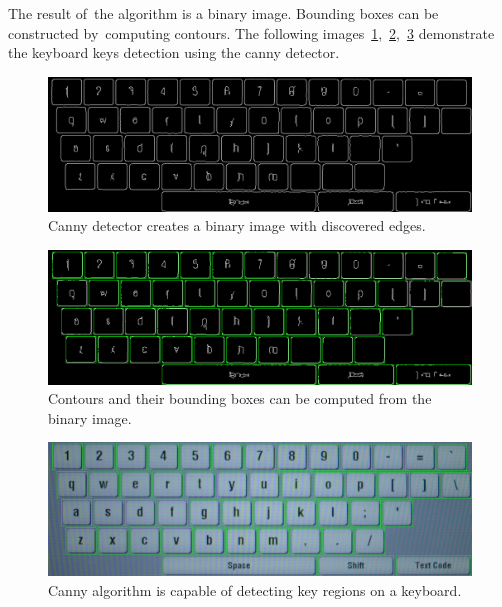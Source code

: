 The result of~the algorithm is a binary image. Bounding boxes can be constructed by~computing contours. The following images~\ref{algorithms-canny-binary},~\ref{algorithms-canny-binary-bboxes},~\ref{algorithms-canny-result-bboxes} demonstrate the keyboard keys detection using the canny detector.
\begin{figure}[hbt]
    \centering
    \includegraphics[width=1\textwidth]{img/algorithms/canny-binary.png}
    \vspace{-15pt}
    \caption{Canny detector creates a binary image with discovered edges.}
    \label{algorithms-canny-binary}
\end{figure}

\begin{figure}[hbt]
    \vspace{-9pt}
    \centering
    \includegraphics[width=1\textwidth]{img/algorithms/canny-binary-bboxes.png}
    \vspace{-15pt}
    \caption{Contours and their bounding boxes can be computed from the binary image.}
    \label{algorithms-canny-binary-bboxes}
\end{figure}

\begin{figure}[hbt]
    \vspace{-9pt}
    \centering
    \includegraphics[width=1\textwidth]{img/algorithms/canny-result-bboxes.png}
    \vspace{-15pt}
    \caption{Canny algorithm is capable of detecting key regions on a keyboard.}
    \label{algorithms-canny-result-bboxes}
\end{figure}

